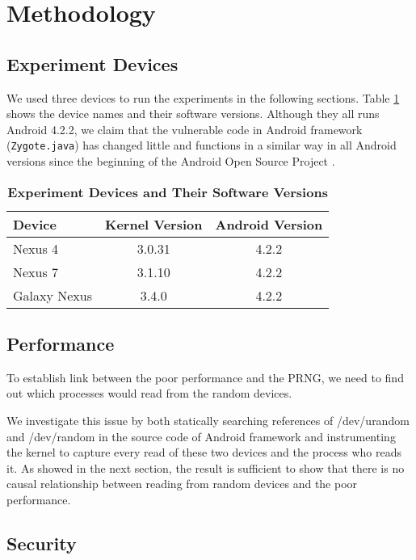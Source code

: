 \section{Methodology}

\subsection{Experiment Devices}

We used three devices to run the experiments in the following sections. Table \ref{tbldevice} shows the device names and their software versions. Although they all runs Android 4.2.2, we claim that the vulnerable code in Android framework (\verb|Zygote.java|) has changed little and functions in a similar way in all Android versions since the beginning of the Android Open Source Project \cite{zygotejava}. 

\begin{table}
\begin{center}
\begin{tabular}{|l|c|c|}
\hline
\bf Device & \bf Kernel Version & \bf Android Version \\
\hline
Nexus 4 & 3.0.31 & 4.2.2 \\
\hline
Nexus 7 & 3.1.10 & 4.2.2 \\
\hline
Galaxy Nexus & 3.4.0 & 4.2.2 \\
\hline

\end{tabular}
\end{center}
\caption{{\bf Experiment Devices and Their Software Versions} }
\label{tbldevice}
\end{table}


\subsection{Performance}

To establish link between the poor performance and the PRNG, we need to find out which processes would read from the random devices.

We investigate this issue by both statically searching references of /dev/urandom and /dev/random in the source code of Android framework and instrumenting the kernel to capture every read of these two devices and the process who reads it. As showed in the next section, the result is sufficient to show that there is no causal relationship between reading from random devices and the poor performance.

\subsection{Security}

